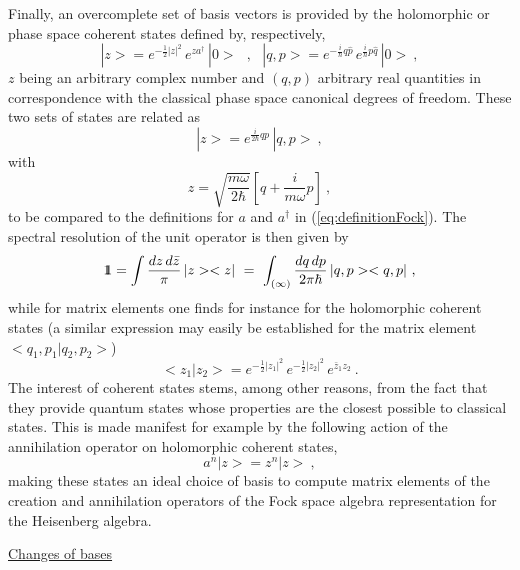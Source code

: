 \documentclass[a4paper,11pt]{article}
\def\one{1\hskip -.37em 1}
\begin{document}
Finally, an overcomplete set of basis vectors is provided by the
holomorphic or phase space coherent states defined by, 
respectively,\cite{Klaud3}
\begin{equation}
|z>=e^{-\frac{1}{2}|z|^2}\,e^{za^\dagger}\,|0>\ \ \ ,\ \ \ 
|q,p>=e^{-\frac{i}{\hbar}q\hat{p}}\,e^{\frac{i}{\hbar}p\hat{q}}\,|0>\ ,
\end{equation}
$z$ being an arbitrary complex number and $(q,p)$ arbitrary
real quantities in correspondence with the classical phase space
canonical degrees of freedom. These two sets of states are related as
\begin{equation}
|z>=e^{\frac{i}{2\hbar}qp}\,|q,p>\ ,
\end{equation}
with
\begin{equation}
z=\sqrt{\frac{m\omega}{2\hbar}}\left[q+\frac{i}{m\omega}p\right]\ ,
\end{equation}
to be compared to the definitions for $a$ and $a^\dagger$ in
(\ref{eq:definitionFock}). The spectral resolution of the unit
operator is then given by
\begin{equation}
\one=\int\frac{dz\,d\bar{z}}{\pi}\,|z><z|\ =\
\int_{(\infty)}\frac{dq\,dp}{2\pi\hbar}\,|q,p><q,p|\ ,
\end{equation}
while for matrix elements one finds for instance for the holomorphic
coherent states (a similar expression may easily be established for the
matrix element $<q_1,p_1|q_2,p_2>$)
\begin{equation}
<z_1|z_2>=e^{-\frac{1}{2}|z_1|^2}\,e^{-\frac{1}{2}|z_2|^2}\,
e^{\bar{z}_1z_2} \ .
\end{equation}
The interest of coherent states stems, among other reasons, from the fact
that they provide quantum states whose properties are the closest possible
to classical states. This is made manifest for example by the following
action of the annihilation operator on holomorphic coherent states,
\begin{equation}
a^n|z>=z^n|z>\ ,
\end{equation}
making these states an ideal choice of basis to compute matrix elements
of the creation and annihilation operators of the Fock space algebra 
representation for the Heisenberg algebra.

\vspace{10pt}

\noindent\underline{Changes of bases}

\vspace{5pt}
\end{document}
